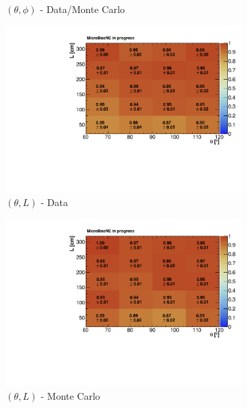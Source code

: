 \documentclass[a4paper]{scrartcl}
\begin{document}
\begin{figure}[htbp]
\begin{subfigure}{0.33\textwidth}
  \caption{$(\theta,\phi)$ - Data/Monte Carlo}
\end{subfigure}
\begin{subfigure}{0.33\textwidth}
  \includegraphics[width=\linewidth]{figures/e_theta_l.pdf}
  \caption{$(\theta,L)$ - Data}
\end{subfigure}\begin{subfigure}{0.33\textwidth}
\includegraphics[width=\linewidth]{figures/theta_l_mc.pdf}
\caption{$(\theta,L)$ - Monte Carlo}
\end{subfigure}\begin{subfigure}{0.33\textwidth}

\end{subfigure}
\end{figure}
\end{document}
